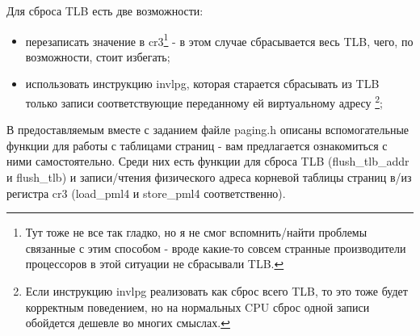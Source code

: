 Для сброса TLB есть две возможности:
\begin{itemize}
  \item перезаписать значение в cr3\footnote{Тут тоже не все так гладко, но я
        не смог вспомнить/найти проблемы связанные с этим способом - вроде
        какие-то совсем странные производители процессоров в этой ситуации
        не сбрасывали TLB.} - в этом случае сбрасывается весь TLB, чего, по
        возможности, стоит избегать;
  \item использовать инструкцию invlpg, которая старается сбрасывать из TLB
        только записи соответствующие переданному ей виртуальному адресу
        \footnote{Если инструкцию invlpg реализовать как сброс всего TLB, то это
        тоже будет корректным поведением, но на нормальных CPU сброс одной
        записи обойдется дешевле во многих смыслах.};
\end{itemize}

В предоставляемым вместе с заданием файле paging.h описаны вспомогательные
функции для работы с таблицами страниц - вам предлагается ознакомиться с ними
самостоятельно. Среди них есть функции для сброса TLB (flush\_tlb\_addr и
flush\_tlb) и записи/чтения физического адреса корневой таблицы страниц в/из
регистра cr3 (load\_pml4 и store\_pml4 соответственно).
